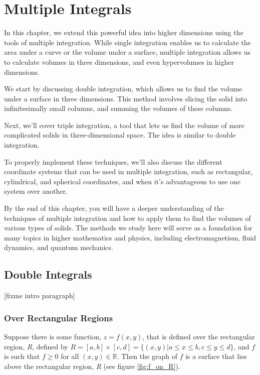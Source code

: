 \chapter{Multiple Integrals}


In this chapter, we extend this powerful idea into higher dimensions using the 
tools of multiple integration. While single integration enables us to calculate
the area under a curve or the volume under a surface, multiple integration 
allows us to calculate volumes in three dimensions, and even hypervolumes in 
higher dimensions.

We start by discussing double integration, which allows us to find the volume 
under a surface in three dimensions. This method involves slicing the solid 
into infinitesimally small columns, and summing the volumes of these columns.

Next, we'll cover triple integration, a tool that lets us find the volume of 
more complicated solids in three-dimensional space. The idea is similar to 
double integration.

To properly implement these techniques, we'll also discuss the different 
coordinate systems that can be used in multiple integration, such as 
rectangular, cylindrical, and spherical coordinates, and when it's advantageous
to use one system over another.

By the end of this chapter, you will have a deeper understanding of the 
techniques of multiple integration and how to apply them to find the volumes 
of various types of solids. The methods we study here will serve as a 
foundation for many topics in higher mathematics and physics, including 
electromagnetism, fluid dynamics, and quantum mechanics.

\section{Double Integrals}
[fixme intro paragraph]

\subsection{Over Rectangular Regions}
Suppose there is some function, $z = f(x,y)$, that is defined over the 
rectangular region, \textit{R}, defined by $\textit{R} = [a, b] \times [c,d] = 
\{(x,y)| a \leq x \leq b, c \leq y \leq d\}$, and $f$ is such that $f \geq 0$ 
for all $(x, y) \in \mathbb{R}$. Then the graph of $f$ is a surface that lies 
above the rectangular region, \textit{R} (see figure \ref{fig:f_on_R}). 

